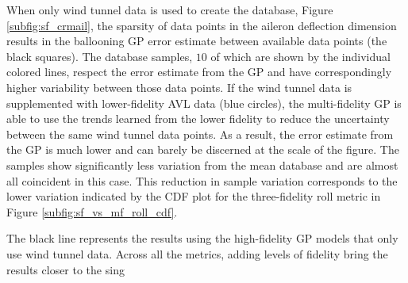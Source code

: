 When only wind tunnel data is used to create the database, Figure \ref{subfig:sf_crmail}, the sparsity of data points in the aileron deflection dimension results in the ballooning GP error estimate between available data points (the black squares).
The database samples, $10$ of which are shown by the individual colored lines,  respect the error estimate from the GP and have correspondingly higher variability between those data points.
If the wind tunnel data is supplemented with lower-fidelity AVL data (blue circles), the multi-fidelity GP is able to use the trends learned from the lower fidelity to reduce the uncertainty between the same wind tunnel data points. 
As a result, the error estimate from the GP is much lower and can barely be discerned at the scale of the figure. 
The samples show significantly less variation from the mean database and are almost all coincident in this case. 
This reduction in sample variation corresponds to the lower variation indicated by the CDF plot for the three-fidelity roll metric in Figure \ref{subfig:sf_vs_mf_roll_cdf}.





The black line represents the results using the high-fidelity GP models that only use wind tunnel data. 
Across all the metrics, adding levels of fidelity bring the results closer to the sing
